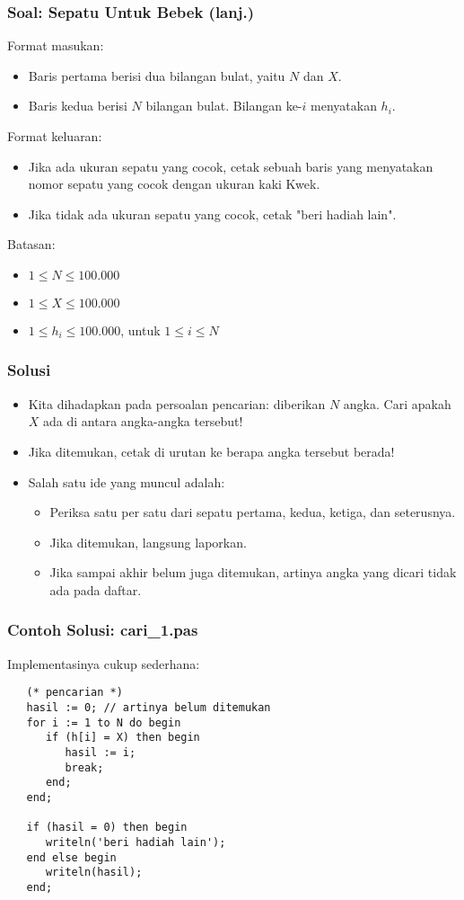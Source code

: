 \documentclass{beamer}
\begin{document}
\begin{frame}
\frametitle{Soal: Sepatu Untuk Bebek (lanj.)}
Format masukan:
\begin{itemize}
    \item Baris pertama berisi dua bilangan bulat, yaitu $N$ dan $X$.
    \item Baris kedua berisi $N$ bilangan bulat. Bilangan ke-$i$ menyatakan $h_i$.
\end{itemize}
Format keluaran:
\begin{itemize}
    \item Jika ada ukuran sepatu yang cocok, cetak sebuah baris yang menyatakan nomor sepatu yang cocok dengan ukuran kaki Kwek.
    \item Jika tidak ada ukuran sepatu yang cocok, cetak "beri hadiah lain".
\end{itemize}
Batasan:
\begin{itemize}
    \item $1 \le N \le 100.000$
    \item $1 \le X \le 100.000$
    \item $1 \le h_i \le 100.000$, untuk $1 \le i \le N$
\end{itemize}
\end{frame}

\begin{frame}
\frametitle{Solusi}
\begin{itemize}
    \item Kita dihadapkan pada persoalan pencarian: diberikan $N$ angka. Cari apakah $X$ ada di antara angka-angka tersebut!
    \item Jika ditemukan, cetak di urutan ke berapa angka tersebut berada!
    \item Salah satu ide yang muncul adalah:
    \begin{itemize}
        \item Periksa satu per satu dari sepatu pertama, kedua, ketiga, dan seterusnya.
        \item Jika ditemukan, langsung laporkan.
        \item Jika sampai akhir belum juga ditemukan, artinya angka yang dicari tidak ada pada daftar.
    \end{itemize}
\end{itemize}
\end{frame}

\begin{frame}[fragile]
\frametitle{Contoh Solusi: cari\_1.pas}
Implementasinya cukup sederhana:
\begin{lstlisting}
   (* pencarian *)
   hasil := 0; // artinya belum ditemukan
   for i := 1 to N do begin
      if (h[i] = X) then begin
         hasil := i;
         break;
      end;
   end;

   if (hasil = 0) then begin
      writeln('beri hadiah lain');
   end else begin
      writeln(hasil);
   end;
\end{lstlisting}
\end{frame}
\end{document}
